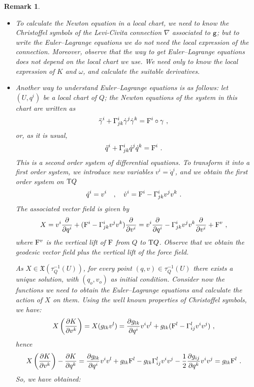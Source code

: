 \documentclass[12pt]{report}
\newtheorem{remark}[teor]{Remark}
\def\bit{\begin{itemize}}
\def\eit{\end{itemize}}
\def\derpar#1#2{\frac{\partial{#1}}{\partial{#2}}}
\def\vf{\mathfrak X}
\def\Tan{{\rm T}}
\begin{document}
\begin{remark}{\rm 
\bit
\item
To calculate the Newton equation in a local chart, we need to know the Christoffel symbols 
of the Levi-Civita connection $\nabla$ associated to ${\tt g}$;
but to write the Euler--Lagrange equations we do not need the local expression of the connection. 
Moreover, observe that the way to get Euler--Lagrange equations does not depend on the local chart we use. We need only to know the local expression of $K$ and $\omega$, and calculate the suitable derivatives.
\item
Another way to understand Euler--Lagrange equations is as follows:
let $(U,q^i)$ be a local chart of $Q$; 
the Newton equations of the system in this chart are written as
$$
\ddot\gamma^i+\Gamma^i_{jk}\dot\gamma^j\dot\gamma^k={\rm F}^i\circ\gamma  \ ,
$$
or, as it is usual,
$$
\ddot q^i+\Gamma^i_{jk}\dot q^j\dot q^k={\rm F}^i \ .
$$
This is a second order system of differential equations. 
To transform it into a first order system, we introduce new variables
$v^i=\dot q^i$, and we obtain the first order system on $\Tan Q$
$$
\dot q^i = v^i \quad , \quad
\dot v^i = {\rm F}^i-\Gamma^i_{jk}v^jv^k \ .
$$
The associated vector field is given by
$$
X=v^i\derpar{}{q^i}+({\rm F}^i-\Gamma^i_{jk}v^jv^k)\derpar{}{v^i} =v^i\derpar{}{q^i}-\Gamma^i_{jk}v^jv^k\derpar{}{v^i}+{\rm F}^v\ ,
$$
where ${\rm F}^v$ is the vertical lift of ${\rm F}$ from $Q$ to $\Tan Q$. Observe that we obtain the geodesic vector field plus the vertical lift of the force field. 

As $X\in\vf (\tau_Q^{-1}(U))$, for every point $(q,v)\in\tau_Q^{-1}(U)$
there exists a unique solution, with $(q_o,v_o)$ as initial condition. 
Consider now the functions we need to obtain 
the Euler--Lagrange equations and calculate the action of $X$ on them. 
Using the well known properties of Christoffel symbols, we have:
$$
X\left(\derpar{K}{v^k}\right) = X(g_{lk}v^l)=
\derpar{g_{lk}}{q^i}v^iv^l+g_{lk}({\rm F}^l-\Gamma_{ij}^lv^iv^j) \ ,
$$
hence
$$
X\left(\derpar{K}{v^k}\right) -\derpar{K}{q^k} =
\derpar{g_{lk}}{q^i}v^iv^l+g_{lk}{\rm F}^l-g_{lk}\Gamma_{ij}^lv^iv^j-
\frac{1}{2}\derpar{g_{ij}}{q^k}v^iv^j=g_{lk}{\rm F}^l \ .
$$
So, we have obtained:
\eit
}\end{remark}
\end{document}
